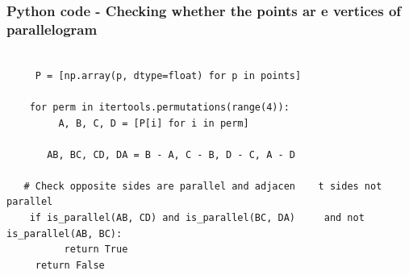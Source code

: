 \documentclass{beamer}
\begin{document}
\begin{frame}[fragile]                            
	\frametitle{Python code - Checking whether the points ar    e vertices of parallelogram}                
	\begin{lstlisting}

     P = [np.array(p, dtype=float) for p in points]

    for perm in itertools.permutations(range(4)):
         A, B, C, D = [P[i] for i in perm]

       AB, BC, CD, DA = B - A, C - B, D - C, A - D

   # Check opposite sides are parallel and adjacen    t sides not parallel
    if is_parallel(AB, CD) and is_parallel(BC, DA)     and not is_parallel(AB, BC):
          return True
     return False
	\end{lstlisting}                            
\end{frame}
\end{document}
